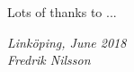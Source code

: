 \begin{acknowledgments}
  Lots of thanks to ...

  \addvspace{1em}
  \begin{flushright}
    \textit{%
      Linköping, June 2018\\
      Fredrik Nilsson%
    }
  \end{flushright}
\end{acknowledgments}
